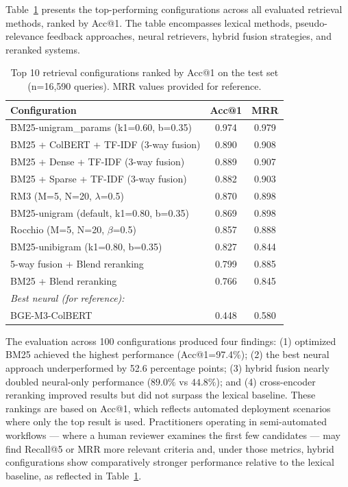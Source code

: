 \documentclass[preprint,12pt]{elsarticle}
\begin{document}
Table~\ref{tab:overall_performance} presents the top-performing configurations across all evaluated retrieval methods, ranked by Acc@1. The table encompasses lexical methods, pseudo-relevance feedback approaches, neural retrievers, hybrid fusion strategies, and reranked systems.

\begin{table}[htbp]
\centering
\caption{Top 10 retrieval configurations ranked by Acc@1 on the test set (n=16,590 queries). MRR values provided for reference.}
\label{tab:overall_performance}
\begin{tabular}{lcc}
\toprule
\textbf{Configuration} & \textbf{Acc@1} & \textbf{MRR} \\
\midrule
BM25-unigram\_params (k1=0.60, b=0.35) & 0.974 & 0.979 \\
BM25 + ColBERT + TF-IDF (3-way fusion) & 0.890 & 0.908 \\
BM25 + Dense + TF-IDF (3-way fusion) & 0.889 & 0.907 \\
BM25 + Sparse + TF-IDF (3-way fusion) & 0.882 & 0.903 \\
RM3 (M=5, N=20, $\lambda$=0.5) & 0.870 & 0.898 \\
BM25-unigram (default, k1=0.80, b=0.35) & 0.869 & 0.898 \\
Rocchio (M=5, N=20, $\beta$=0.5) & 0.857 & 0.888 \\
BM25-unibigram (k1=0.80, b=0.35) & 0.827 & 0.844 \\
5-way fusion + Blend reranking & 0.799 & 0.885 \\
BM25 + Blend reranking & 0.766 & 0.845 \\
\midrule
\multicolumn{3}{l}{\textit{Best neural (for reference):}} \\
BGE-M3-ColBERT & 0.448 & 0.580 \\
\bottomrule
\end{tabular}
\end{table}

The evaluation across 100 configurations produced four findings: (1) optimized BM25 achieved the highest performance (Acc@1=97.4\%); (2) the best neural approach underperformed by 52.6 percentage points; (3) hybrid fusion nearly doubled neural-only performance ($89.0\%$ vs $44.8\%$); and (4) cross-encoder reranking improved results but did not surpass the lexical baseline.
These rankings are based on Acc@1, which reflects automated deployment scenarios where only the top result is used. Practitioners operating in semi-automated workflows — where a human reviewer examines the first few candidates — may find Recall@5 or MRR more relevant criteria and, under those metrics, hybrid configurations show comparatively stronger performance relative to the lexical baseline, as reflected in Table~\ref{tab:overall_performance}.
\end{document}

